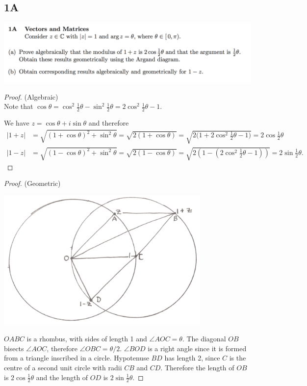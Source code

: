 \documentclass[12pt]{article}
\begin{document}
\subsection*{1A}
\begin{mdframed}
\includegraphics[width=400pt]{img/misc--cambridge-1a-2017-1-1A.png}
\end{mdframed}
\begin{proof}(Algebraic)\\
Note that
$\cos\theta = \cos^2\frac{1}{2}\theta - \sin^2\frac{1}{2}\theta = 2\cos^2\frac{1}{2}\theta - 1$.

We have $z = \cos\theta + i\sin\theta$ and therefore
\begin{align}
  |1 + z|  &= \sqrt{(1 + \cos\theta)^2 + \sin^2\theta}
             = \sqrt{2(1 + \cos\theta)}
             = \sqrt{2\Big(1 + 2\cos^2\frac{1}{2}\theta - 1\Big)}
             = 2\cos\frac{1}{2}\theta\\
  |1 - z| &= \sqrt{(1 - \cos\theta)^2 + \sin^2\theta}
            = \sqrt{2(1 - \cos\theta)}
            = \sqrt{2(1 - (2\cos^2\frac{1}{2}\theta - 1))}
            = 2\sin\frac{1}{2}\theta.
\end{align}
\end{proof}

\begin{proof}(Geometric)\\
  \begin{mdframed}
    \includegraphics[width=300pt]{img/misc--cambridge-1a-2017-1-1A-diagram.png}
  \end{mdframed}
  $OABC$ is a rhombus, with sides of length 1 and $\angle AOC=\theta$. The diagonal $OB$ bisects
  $\angle AOC$, therefore $\angle OBC = \theta/2$. $\angle BOD$ is a right angle since it is formed
  from a triangle inscribed in a circle. Hypotenuse $BD$ has length 2, since $C$ is the centre of a
  second unit circle with radii $CB$ and $CD$. Therefore the length of $OB$ is
  $2\cos\frac{1}{2}\theta$ and the length of $OD$ is $2\sin\frac{1}{2}\theta$.
\end{proof}
\end{document}
